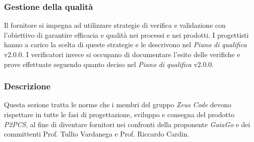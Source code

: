 	\subsubsection{Gestione della qualità}
	Il fornitore si impegna ad utilizzare strategie di verifica e validazione con l'obiettivo di garantire efficacia e qualità nei processi e nei prodotti. I progettisti hanno a carico la scelta di queste strategie e le descrivono nel \textit{Piano di qualifica} v2.0.0. I verificatori invece si occupano di documentare l'esito delle verifiche e prove effettuate seguendo quanto deciso nel \textit{Piano di qualifica} v2.0.0.
	\subsubsection{Descrizione}
	Questa sezione tratta le norme che i membri del gruppo \textit{Zeus Code} devono rispettare in tutte le fasi di progettazione, sviluppo e consegna del prodotto \textit{P2PCS}, al fine di diventare fornitori nei confronti della proponente \textit{GaiaGo} e dei committenti Prof. Tullio Vardanega e Prof. Riccardo Cardin.
